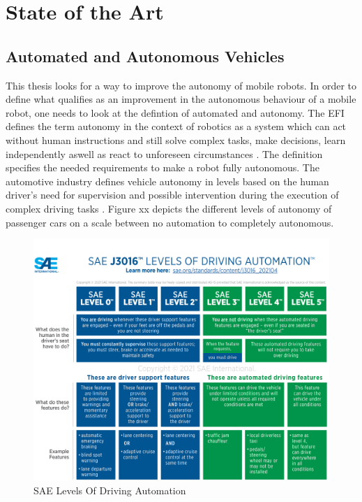 \chapter{State of the Art}
\label{cha:state of the art}

\section{Automated and Autonomous Vehicles}

This thesis looks for a way to improve the autonomy of mobile robots. In order to define what qualifies as an improvement in the autonomous behaviour of a mobile robot, one needs to look at the defintion of automated and autonomy. 
The EFI defines the term autonomy in the context of robotics as a system which can act without human instructions and still solve complex tasks, make decisions, learn independently aswell as react to unforeseen circumstances \cite{efi2018}. 
The definition specifies the needed requirements to make a robot fully autonomous. 
The automotive industry defines vehicle autonomy in levels based on the human driver's need for supervision and possible intervention during the execution of complex driving tasks \cite{J3016_202104}. Figure xx depicts the different levels of autonomy of passenger cars on a scale between no automation to completely autonomous. \\

\begin{figure}
	\includegraphics[width=1.0\textwidth]{images/j3016graphic_2021.png}
	\caption{SAE Levels Of Driving Automation \cite{J3016_202104}  }
\end{figure}


